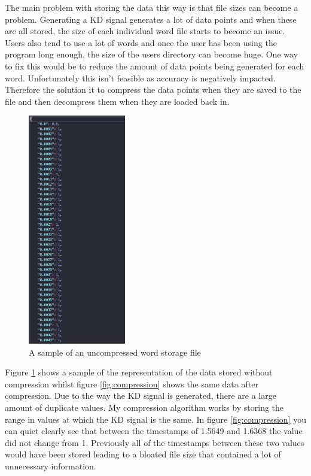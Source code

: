 \documentclass[10pt,a4paper]{report}
\begin{document}
The main problem with storing the data this way is that file sizes can become a problem. Generating a KD signal generates a lot of data points and when these are all stored, the size of each individual word file starts to become an issue. Users also tend to use a lot of words and once the user has been using the program long enough, the size of the users directory can become huge. One way to fix this would be to reduce the amount of data points being generated for each word. Unfortunately this isn't feasible as accuracy is negatively impacted. Therefore the solution it to compress the data points when they are saved to the file and then decompress them when they are loaded back in.


\begin{figure}
	\begin{center}
		\includegraphics[width=0.38\textwidth]{UncompressedData}
	\end{center}
	\caption{A sample of an uncompressed word storage file}
	\label{fig:uncomp}
\end{figure}

Figure \ref{fig:uncomp} shows a sample of the representation of the data stored without compression whilst figure \ref{fig:compression} shows the same data after compression. Due to the way the KD signal is generated, there are a large amount of duplicate values. My compression algorithm works by storing the range in values at which the KD signal is the same. In figure \ref{fig:compression} you can quiet clearly see that between the timestamps of 1.5649 and 1.6368 the value did not change from 1. Previously all of the timestamps between these two values would have been stored leading to a bloated file size that contained a lot of unnecessary information.
\end{document}

